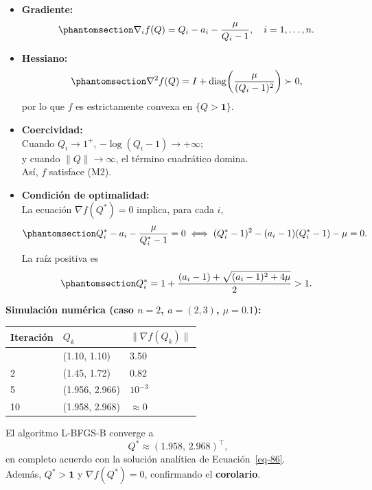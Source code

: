 \documentclass[
  spanish,
  us-letterpaper,
]{scrreprt}
\numberwithin{equation}{section}
\begin{document}
\begin{itemize}
\item
  \textbf{Gradiente:} \begin{equation}\phantomsection\label{eq-83}{
  \nabla_i f(Q) = Q_i - a_i - \frac{\mu}{Q_i - 1}, \quad i = 1,\dots,n.
  }\end{equation}
\item
  \textbf{Hessiano:} \begin{equation}\phantomsection\label{eq-84}{
  \nabla^2 f(Q) = I + \operatorname{diag}\!\left(\frac{\mu}{(Q_i - 1)^2}\right) \succ 0,
  }\end{equation} por lo que \(f\) es estrictamente convexa en
  \(\{Q > \mathbf{1}\}\).
\item
  \textbf{Coercividad:}\\
  Cuando \(Q_i \to 1^+\), \(-\log(Q_i - 1) \to +\infty\);\\
  y cuando \(\|Q\| \to \infty\), el término cuadrático domina.\\
  Así, \(f\) satisface (M2).
\item
  \textbf{Condición de optimalidad:}\\
  La ecuación \(\nabla f(Q^*) = 0\) implica, para cada \(i\),
  \begin{equation}\phantomsection\label{eq-85}{
  Q_i^* - a_i - \frac{\mu}{Q_i^* - 1} = 0
  \;\Longleftrightarrow\;
  (Q_i^* - 1)^2 - (a_i - 1)(Q_i^* - 1) - \mu = 0. 
  }\end{equation} La raíz positiva es
  \begin{equation}\phantomsection\label{eq-86}{
  Q_i^* = 1 + \frac{(a_i - 1) + \sqrt{(a_i - 1)^2 + 4\mu}}{2} > 1. 
  }\end{equation}
\end{itemize}

\textbf{Simulación numérica (caso \(n=2\), \(a=(2,3)\), \(\mu=0.1\)):}

\begin{longtable}[]{@{}lll@{}}
\toprule\noalign{}
Iteración & \(Q_k\) & \(\|\nabla f(Q_k)\|\) \\
\midrule\noalign{}
\endhead
\bottomrule\noalign{}
\endlastfoot
0 & (1.10, 1.10) & 3.50 \\
2 & (1.45, 1.72) & 0.82 \\
5 & (1.956, 2.966) & \(10^{-3}\) \\
10 & (1.958, 2.968) & \(\approx 0\) \\
\end{longtable}

El algoritmo L-BFGS-B converge a\\
\[
Q^* \approx (1.958,\,2.968)^\top,
\] en completo acuerdo con la solución analítica de
Ecuación~\ref{eq-86}.\\
Además, \(Q^* > \mathbf{1}\) y \(\nabla f(Q^*) = 0\), confirmando el
\textbf{corolario}.
\end{document}
